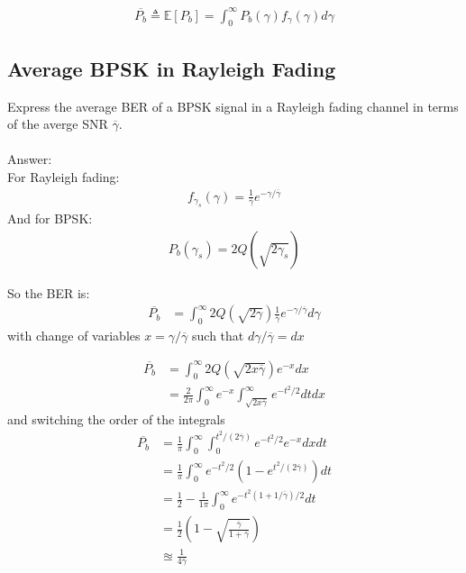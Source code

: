 \documentclass[12pt]{report} %
\newcommand{\E}[1]{\mathbb{E}\left[ #1 \right]}
\begin{document}
\begin{align}
  \overline{P_b}  \triangleq \E{P_b} = \int_0^{\infty} P_{b}(\gamma) f_{\gamma}(\gamma) d\gamma
\end{align}
\begin{mdframed}

  \subsection*{Average BPSK in Rayleigh Fading}
  Express the average \gls{BER} of a BPSK signal in a Rayleigh fading channel in terms of the averge SNR $\overline{\gamma}$.
  \\
  \\
  Answer: \\
  For Rayleigh fading:
  \begin{align}
    f_{\gamma_s}(\gamma) = \frac{1}{\overline{\gamma}} e^{-\gamma/\overline{\gamma}}\nonumber
  \end{align}
  And for BPSK:
  \begin{align}
    P_b(\gamma_s) = 2Q(\sqrt{2\gamma_s}) \nonumber
  \end{align}

  So the \gls{BER} is:
  \begin{align}
    \overline{P_b} & = \int_0^{\infty} 2Q(\sqrt{2\gamma}) \frac{1}{\overline{\gamma}} e^{-\gamma/\overline{\gamma}} d\gamma \nonumber
  \end{align}
  with change of variables $x = \gamma/\overline{\gamma}$ such that $d \gamma/\overline{\gamma} = d x $

  \begin{align}
    \overline{P_b} & = \int_0^{\infty} 2Q(\sqrt{2x\overline{\gamma}}) e^{-x} dx \nonumber                                         \\
                   & = \frac{2}{2\pi} \int_0^{\infty} e^{-x} \int_{\sqrt{2x\overline{\gamma}}}^{\infty} e^{-t^2/2} dtdx \nonumber
  \end{align}
  and switching the order of the integrals
  \begin{align}
    \overline{P_b} & = \frac{1}{\pi} \int_0^{\infty} \int_{0}^{t^2/(2\overline{\gamma})} e^{-t^2/2} e^{-x}  dxdt \nonumber \\
                   & = \frac{1}{\pi} \int_0^{\infty} e^{-t^2/2}(1-e^{t^2/(2\overline{\gamma})}) dt \nonumber               \\
                   & = \frac{1}{2} - \frac{1}{1\pi} \int_0^{\infty} e^{-t^2(1+1/\overline{\gamma})/2} dt \nonumber         \\
                   & = \frac{1}{2} \left( 1-\sqrt{\frac{\overline{\gamma}}{1+\overline{\gamma}}}\right) \nonumber          \\
                   & \approxeq \frac{1}{4\overline{\gamma}} \nonumber
  \end{align}
\end{mdframed}
\end{document}
